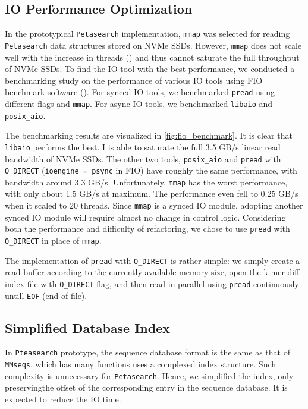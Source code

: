 \subsection{IO Performance Optimization}

In the prototypical \texttt{Petasearch} implementation, \texttt{mmap} was selected for reading \texttt{Petasearch} data structures stored on NVMe SSDs. However, \texttt{mmap} does not scale well with the increase in threads (\cite{papagiannis2020optimizing}) and thus cannot saturate the full throughput of NVMe SSDs. To find the IO tool with the best performance, we conducted a benchmarking study on the performance of various IO tools using FIO benchmark software (\cite{AxboeFlexibleIOTester2022}). For synced IO tools, we benchmarked \texttt{pread} using different flags and \texttt{mmap}. For async IO tools, we benchmarked \texttt{libaio} and \texttt{posix\_aio}.

The benchmarking results are visualized in \autoref{fig:fio_benchmark}. It is clear that \texttt{libaio} performs the best. I is able to saturate the full 3.5 GB/s linear read bandwidth of NVMe SSDs. The other two tools, \texttt{posix\_aio} and \texttt{pread} with \texttt{O\_DIRECT} (\texttt{ioengine = psync} in FIO) have roughly the same performance, with bandwidth around 3.3 GB/s. Unfortunately, \texttt{mmap} has the worst performance, with only about 1.5 GB/s at maximum. The performance even fell to 0.25 GB/s when it scaled to 20 threads. Since \texttt{mmap} is a synced IO module, adopting another synced IO module will require almost no change in control logic. Considering both the performance and difficulty of refactoring, we chose to use \texttt{pread} with \texttt{O\_DIRECT} in place of \texttt{mmap}.

The implementation of \texttt{pread} with \texttt{O\_DIRECT} is rather simple: we simply create a read buffer according to the currently available memory size, open the k-mer diff-index file with \texttt{O\_DIRECT} flag, and then read in parallel using \texttt{pread} continuously untill \texttt{EOF} (end of file).

\subsection{Simplified Database Index}

In \texttt{Pteasearch} prototype, the sequence database format is the same as that of \texttt{MMseqs}, which has many functions uses a complexed index structure. Such complexity is unnecessary for \texttt{Petasearch}. Hence, we simplified the index, only preservingthe offset of the corresponding entry in the sequence database. It is expected to reduce the IO time.

